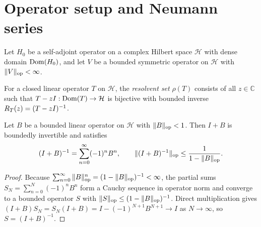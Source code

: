 \section{Operator setup and Neumann series}
\label{sec:setup}

\begin{myassump}
\label{assump:domain}
Let $H_0$ be a self-adjoint operator on a complex Hilbert space $\mathcal{H}$
with dense domain $\operatorname{Dom}(H_0)$, and let $V$ be a bounded symmetric operator on
$\mathcal{H}$ with $\|V\|_{\mathrm{op}} < \infty$.
\end{myassump}

\begin{mydef}
\label{def:resolvent}
For a closed linear operator $T$ on $\mathcal{H}$, the \emph{resolvent set}
$\rho(T)$ consists of all $z \in \mathbb{C}$ such that
$T - zI : \operatorname{Dom}(T) \to \mathcal{H}$ is bijective with bounded inverse
$R_T(z) = (T - zI)^{-1}$.
\end{mydef}

\begin{mylem}
\label{lem:neumann}
Let $B$ be a bounded linear operator on $\mathcal{H}$ with $\|B\|_{\mathrm{op}} < 1$.
Then $I + B$ is boundedly invertible and satisfies
\begin{equation}
\label{eq:neumann-series}
(I + B)^{-1} = \sum_{n=0}^{\infty} (-1)^n B^n,
\qquad
\|(I + B)^{-1}\|_{\mathrm{op}} \le \frac{1}{1 - \|B\|_{\mathrm{op}}}.
\end{equation}
\end{mylem}
\begin{proof}
Because $\sum_{n=0}^{\infty} \|B\|_{\mathrm{op}}^n = (1 - \|B\|_{\mathrm{op}})^{-1} < \infty$,
the partial sums $S_N = \sum_{n=0}^{N} (-1)^n B^n$ form a Cauchy sequence in
operator norm and converge to a bounded operator $S$ with
$\|S\|_{\mathrm{op}} \le (1 - \|B\|_{\mathrm{op}})^{-1}$. Direct multiplication gives
$(I + B) S_N = S_N (I + B) = I - (-1)^{N+1} B^{N+1} \to I$ as $N \to \infty$,
so $S = (I + B)^{-1}$.
\end{proof}
